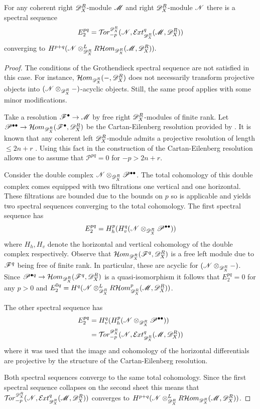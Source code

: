  \begin{proposition}\label{prop: SpectralTorExt}
   For any coherent right $\mathscr{D}_X^R$-module $\mathscr{M}$ and right $\mathscr{D}_X^R$-module $\mathscr{N}$ there is a spectral sequence
   $$E_2^{pq}= \Tr{\D_X^R}{-p}(\N,\Ex{\D_X^R}{q}(\M,\D_X^R)) $$
   converging to $H^{p+q} (\mathscr{N}\otimes_{\mathscr{D}_X^R}^L R\mathcal{H}om_{\mathscr{D}_X^R}(\mathscr{M},\mathscr{D}_X^R) ).$
 \end{proposition}
 \begin{proof}
   The conditions of the Grothendieck spectral sequence  are not satisfied in this case.
   For instance, $\Hom_{\sc{\D_X^R}}(\blank,\D_X^R)$ does not necessarily transform projective objects into $(\mathscr{N}\otimes_{\mathscr{D}_X^R}{-})$-acyclic objects.
   Still, the same proof applies with some minor modifications.

  Take a resolution $\mathscr{F}^\bullet \to \mathscr{M}$ by free right $\mathscr{D}_X^R$-modules of finite rank.
  Let $\mathscr{P}^{\bullet\bullet}\to \mathcal{H}om_{\mathscr{D}_X^R}(\mathscr{F}^{\bullet},\mathscr{D}_X^R)$ be the Cartan-Eilenberg resolution provided by .
  It is known that any coherent left $\mathscr{D}_X^R$-module admits a projective resolution of length $\leq 2n + r$ \cite[p6]{budur2020zeroI}.
  Using this fact in the construction of the Cartan-Eilenberg resolution allows one to assume that $\mathscr{P}^{pq}=0$ for $-p>2n + r$.

  Consider the double complex $\mathscr{N}\otimes_{\mathscr{D}_X^R}\mathscr{P}^{\bullet \bullet}$.
  The total cohomology of this double complex comes equipped with two filtrations one vertical and one horizontal.
  These filtrations are bounded due to the bounds on $p$ so  is applicable and yields two spectral sequences converging to the total cohomology.
  The first spectral sequence has
  $$E_{2}^{pq} = H^p_h(H^q_v(\mathscr{N} \otimes_{\mathscr{D}_X^R}\mathscr{P}^{\bullet \bullet}))$$
  where $H_h,H_v$ denote the horizontal and vertical cohomology of the double complex respectively. 
  Observe that $\mathcal{H}om_{\mathscr{D}_X^R}(\mathscr{F}^q, \mathscr{D}_X^R)$ is a free left module due to $\mathscr{F}^q$ being free of finite rank.
  In particular, these are acyclic for $(\mathscr{N}\otimes_{\mathscr{D}_X^R}{-})$.
  Since $\mathscr{P}^{\bullet q}\to \mathcal{H}om_{\mathscr{D}_X^R}(\mathscr{F}^q,\mathscr{D}_X^R)$ is a quasi-isomorphism it follows that $E_2^{pq}=0$ for any $p>0$ and $E_2^{0q} = H^{q} (\mathscr{N}\otimes_{\mathscr{D}_X^R}^LR\mathcal{H}om_{\mathscr{D}_X^R}^p(\mathscr{M},\mathscr{D}_X^R) )$.

  The other spectral sequence has
  \begin{align*}
      E_2^{pq} &= H^q_v(H^p_h(\N\otimes_{\D_X^R}\mathscr{P}^{\bullet\bullet}))\\
      &=  \Tr{\D_X^R}{-p}(\N,\Ex{\D_X^R}{q}(\M,\D_X^R))
  \end{align*}
  where it was used that the image and cohomology of the horizontal differentials are projective by the structure of the Cartan-Eilenberg resolution.

  Both spectral sequences converge to the same total cohomology.
  Since the first spectral sequence collapses on the second sheet this means that $\Tr{\D_X^R}{-p}(\N,\Ex{\D_X^R}{q}(\M,\D_X^R))$ converges to $H^{p+q}( \mathscr{N}\otimes_{\mathscr{D}_X^R}^LR\mathcal{H}om_{\mathscr{D}_X^R}(\mathscr{M},\mathscr{D}_X^R) )$.
 \end{proof}
